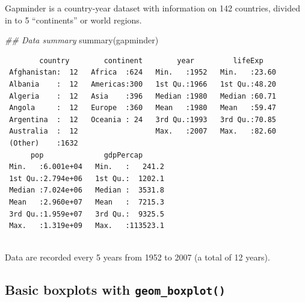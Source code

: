 \documentclass[
  letterpaper,
  DIV=11,
  numbers=noendperiod]{scrreprt}
\newenvironment{Shaded}{\begin{snugshade}}{\end{snugshade}}
\newcommand{\DocumentationTok}[1]{\textcolor[rgb]{0.37,0.37,0.37}{\textit{#1}}}
\newcommand{\FunctionTok}[1]{\textcolor[rgb]{0.28,0.35,0.67}{#1}}
\newcommand{\NormalTok}[1]{\textcolor[rgb]{0.00,0.23,0.31}{#1}}
\begin{document}
\begin{tcolorbox}[enhanced jigsaw, titlerule=0mm, colback=white, left=2mm, breakable, opacitybacktitle=0.6, colbacktitle=quarto-callout-note-color!10!white, colframe=quarto-callout-note-color-frame, bottomtitle=1mm, opacityback=0, coltitle=black, arc=.35mm, toptitle=1mm, title=\textcolor{quarto-callout-note-color}{\faInfo}\hspace{0.5em}{Recap}, leftrule=.75mm, toprule=.15mm, bottomrule=.15mm, rightrule=.15mm]

Gapminder is a country-year dataset with information on 142 countries,
divided in to 5 ``continents'' or world regions.

\begin{Shaded}
\begin{Highlighting}[]
\DocumentationTok{\#\# Data summary}
\FunctionTok{summary}\NormalTok{(gapminder)}
\end{Highlighting}
\end{Shaded}

\begin{verbatim}
        country        continent        year         lifeExp     
 Afghanistan:  12   Africa  :624   Min.   :1952   Min.   :23.60  
 Albania    :  12   Americas:300   1st Qu.:1966   1st Qu.:48.20  
 Algeria    :  12   Asia    :396   Median :1980   Median :60.71  
 Angola     :  12   Europe  :360   Mean   :1980   Mean   :59.47  
 Argentina  :  12   Oceania : 24   3rd Qu.:1993   3rd Qu.:70.85  
 Australia  :  12                  Max.   :2007   Max.   :82.60  
 (Other)    :1632                                                
      pop              gdpPercap       
 Min.   :6.001e+04   Min.   :   241.2  
 1st Qu.:2.794e+06   1st Qu.:  1202.1  
 Median :7.024e+06   Median :  3531.8  
 Mean   :2.960e+07   Mean   :  7215.3  
 3rd Qu.:1.959e+07   3rd Qu.:  9325.5  
 Max.   :1.319e+09   Max.   :113523.1  
                                       
\end{verbatim}

Data are recorded every 5 years from 1952 to 2007 (a total of 12 years).

\end{tcolorbox}

\subsection{\texorpdfstring{Basic boxplots with
\texttt{geom\_boxplot()}}{Basic boxplots with geom\_boxplot()}}\label{basic-boxplots-with-geom_boxplot}
\end{document}
